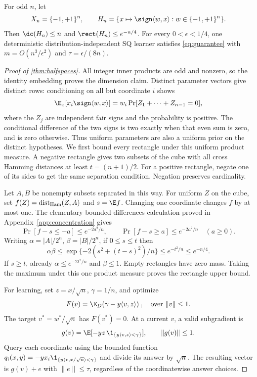 \begin{theorem}\label{thm:halfspaces}
For odd $n$, let
\[
 X_n=\{-1,+1\}^n,\qquad
 H_n=\{x\mapsto\sign\langle w,x\rangle:w\in\{-1,+1\}^n\}.
\]
Then $\dc(H_n)\le n$ and $\rect(H_n)\le e^{-n/4}$. For every $0<\epsilon<1/4$, one deterministic distribution-independent SQ learner satisfies \eqref{eq:guarantee} with $m=O(n^3/\epsilon^2)$ and $\tau=\epsilon/(8n)$.
\end{theorem}

\begin{proof}[Proof of \cref{thm:halfspaces}]
All integer inner products are odd and nonzero, so the identity embedding proves the dimension claim. Distinct parameter vectors give distinct rows: conditioning on all but coordinate $i$ shows
\[
 \E_x[x_i\sign\langle w,x\rangle]
 =w_i\Pr[Z_1+\cdots+Z_{n-1}=0],
\]
where the $Z_j$ are independent fair signs and the probability is positive. The conditional difference of the two signs is two exactly when that even sum is zero, and is zero otherwise. Thus uniform parameters are also a uniform prior on the distinct hypotheses. We first bound every rectangle under this uniform product measure. A negative rectangle gives two subsets of the cube with all cross Hamming distances at least $t=(n+1)/2$. For a positive rectangle, negate one of its sides to get the same separation condition. Negation preserves cardinality.

Let $A,B$ be nonempty subsets separated in this way. For uniform $Z$ on the cube, set $f(Z)=\operatorname{dist}_{\rm Ham}(Z,A)$ and $s=\E f$. Changing one coordinate changes $f$ by at most one. The elementary bounded-differences calculation proved in Appendix~\ref{app:concentration} gives
\[
 \Pr[f-s\le-a]\le e^{-2a^2/n},\qquad
 \Pr[f-s\ge a]\le e^{-2a^2/n}\quad(a\ge0).
\]
Writing $\alpha=|A|/2^n$, $\beta=|B|/2^n$, if $0\le s\le t$ then
\[
 \alpha\beta\le\exp\{-2(s^2+(t-s)^2)/n\}
 \le e^{-t^2/n}\le e^{-n/4}.
\]
If $s\ge t$, already $\alpha\le e^{-2t^2/n}$ and $\beta\le1$. Empty rectangles have zero mass. Taking the maximum under this one product measure proves the rectangle upper bound.

For learning, set $z=x/\sqrt n$, $\gamma=1/n$, and optimize
\[
 F(v)=\E_D(\gamma-y\langle v,z\rangle)_+
 \quad\text{over }\|v\|\le1.
\]
The target $v^*=w^*/\sqrt n$ has $F(v^*)=0$. At a current $v$, a valid subgradient is
\[
 g(v)=\E[-yz\,\1_{\{y\langle v,z\rangle<\gamma\}}],\qquad\|g(v)\|\le1.
\]
Query each coordinate using the bounded function
$q_i(x,y)=-yx_i\1_{\{y\langle v,x/\sqrt n\rangle<\gamma\}}$ and divide its answer by $\sqrt n$. The resulting vector is $g(v)+e$ with $\|e\|\le\tau$, regardless of the coordinatewise answer choices.


\end{proof}
